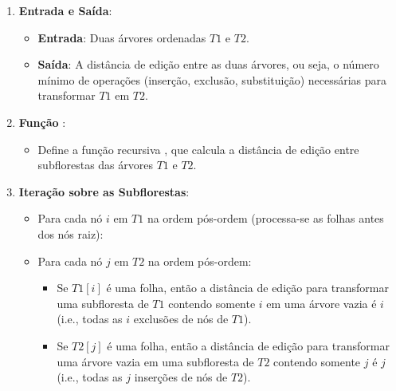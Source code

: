 \documentclass[12pt]{article}
\begin{document}
\begin{enumerate}
    \item \textbf{Entrada e Saída}:
    \begin{itemize}
        \item \textbf{Entrada}: Duas árvores ordenadas $T1$ e $T2$.
        \item \textbf{Saída}: A distância de edição entre as duas árvores, ou seja, o número mínimo de operações (inserção, exclusão, substituição) necessárias para transformar $T1$ em $T2$.
    \end{itemize}
    
    \item \textbf{Função \Forestdist}:
    \begin{itemize}
        \item Define a função recursiva \Forestdist, que calcula a distância de edição entre subflorestas das árvores $T1$ e $T2$.
    \end{itemize}
    
    \item \textbf{Iteração sobre as Subflorestas}:
    \begin{itemize}
        \item Para cada nó $i$ em $T1$ na ordem pós-ordem (processa-se as folhas antes dos nós raiz):
        \item Para cada nó $j$ em $T2$ na ordem pós-ordem:
        \begin{itemize}
            \item Se $T1[i]$ é uma folha, então a distância de edição para transformar uma subfloresta de $T1$ contendo somente $i$ em uma árvore vazia é $i$ (i.e., todas as $i$ exclusões de nós de $T1$).
            \item Se $T2[j]$ é uma folha, então a distância de edição para transformar uma árvore vazia em uma subfloresta de $T2$ contendo somente $j$ é $j$ (i.e., todas as $j$ inserções de nós de $T2$).
        \end{itemize}
    \end{itemize}
    

\end{enumerate}
\end{document}
